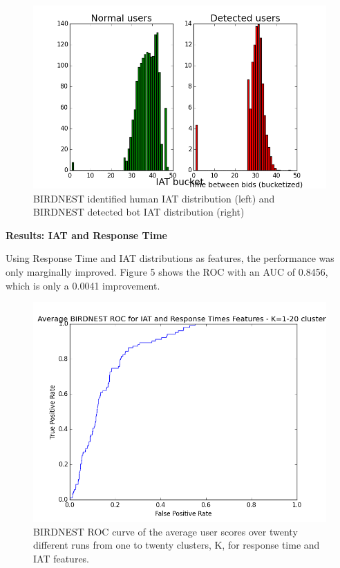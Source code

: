 \documentclass{article} %
\begin{document}
\begin{figure}[h]
\centering
{\caption{BIRDNEST identified human IAT distribution (left) and BIRDNEST detected bot IAT distribution (right)} \includegraphics[scale=0.5]{img/bird_iat_pred.png}}
\end{figure}

\textbf{Results: IAT and Response Time}

Using Response Time and IAT distributions as features, the performance was only marginally improved.
Figure 5 shows the ROC with an AUC of 0.8456, which is only a 0.0041 improvement.

\clearpage

\begin{figure}[!htb]
\centering
{\caption{BIRDNEST ROC curve of the average user scores over twenty different runs from one to twenty clusters, K, for response time and IAT features.} \includegraphics[scale=0.47]{img/bird_roc.png}}
\end{figure}
\end{document}

